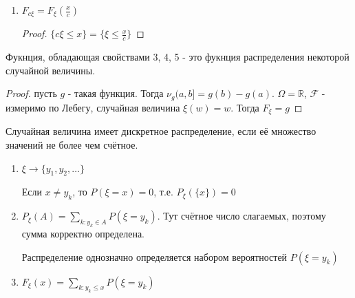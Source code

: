 \begin{properties}
\begin{enumerate}
{            \begin{proof}
                $\{ \xi + a \leqslant x \} = \{ \xi \leqslant x - a \}$
            \end{proof}
        }
        \item {
            $F_{c\xi} = F_{\xi} (\frac{x}{c})$

            \begin{proof}
                $\{ c\xi \leqslant x \} =  \{ \xi \leqslant \frac{x}{c} \}$
            \end{proof}
        }
    \end{enumerate}

    \begin{remark}
        Фукнция, обладающая свойствами 3, 4, 5 - это фукнция распределения
        некоторой случайной величины.

        \begin{proof}
            пусть $g$ - такая функция. Тогда $\nu_g (a, b] = g(b) - g(a)$. $\Omega = \mathbb{R}$, $\mathcal{F}$ - измеримо по Лебегу, случайная величина $\xi (w) = w$. Тогда $F_{\xi} = g$
        \end{proof}
    \end{remark}

\end{properties}

\begin{definition}
    Случайная величина имеет дискретное распределение, если её
    множество значений не более чем счётное.

    \begin{remark}
        \begin{enumerate}
            \item { $\xi \to \{y_1, y_2, \ldots \}$

            Если $x \neq y_k$, то $P(\xi = x) = 0$, т.е. $P_{\xi}(\{ x \}) = 0$
            }

            \item { $P_{\xi} (A) = \sum_{k : y_k \in A} P(\xi = y_k)$. Тут счётное
            число слагаемых, поэтому сумма корректно определена.

            Распределение однозначно определяется набором вероятностей $P(\xi = y_k)$
            }
            \item {
                $F_{\xi} (x) = \sum_{k : y_k \leqslant x} P(\xi = y_k)$
            }
        \end{enumerate}
    \end{remark}
\end{definition}


